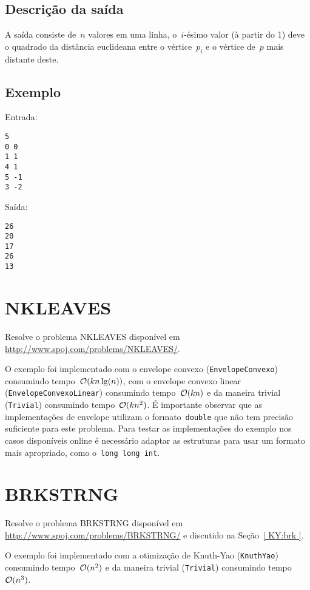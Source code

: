 \subsection*{Descrição da saída}
A saída consiste de~$n$ valores em uma linha, o~$i$-ésimo valor (à partir do 1) deve o quadrado da distância euclideana entre o vértice~$p_i$ e o vértice de~$p$ mais distante deste.

\subsection*{Exemplo}
Entrada:
\begin{verbatim}
5
0 0
1 1
4 1
5 -1
3 -2
\end{verbatim}
Saída:
\begin{verbatim}
26
20
17
26
13
\end{verbatim}


\section{NKLEAVES} \label{NKLEAVES}

Resolve o problema NKLEAVES disponível em \href{http://www.spoj.com/problems/NKLEAVES/}{http://www.spoj.com/problems/NKLEAVES/}.

O exemplo foi implementado com o envelope convexo (\texttt{EnvelopeConvexo}) consumindo tempo~$\mathcal{O}(kn\lg(n))$, com o envelope convexo linear (\texttt{EnvelopeConvexoLinear}) consumindo tempo~$\mathcal{O}(kn)$ e da maneira trivial (\texttt{Trivial}) consumindo tempo~$\mathcal{O}(kn^2)$. É importante observar que as implementações de envelope utilizam o formato~\texttt{double} que não tem precisão suficiente para este problema. Para testar as implementações do exemplo nos casos disponíveis online é necessário adaptar as estruturas para usar um formato mais apropriado, como o~\texttt{long long int}.


\section{BRKSTRNG} \label{BRKSTRNG}

Resolve o problema BRKSTRNG disponível em \href{http://www.spoj.com/problems/BRKSTRNG/}{http://www.spoj.com/problems/BRKSTRNG/} e discutido na Seção~\ref{ KY:brk }.

O exemplo foi implementado com a otimização de Knuth-Yao (\texttt{KnuthYao}) consumindo tempo~$\mathcal{O}(n^2)$ e da maneira trivial (\texttt{Trivial}) consumindo tempo~$\mathcal{O}(n^3)$.

